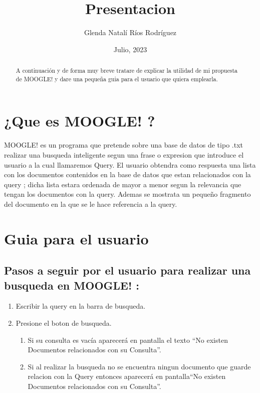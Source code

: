 \documentclass[a4paper,12pt]{article}
\begin{document}
\title{Presentacion}
\author{Glenda Natalí Ríos Rodríguez}
\date{Julio, 2023}
\maketitle

\begin{abstract}
   A continuación y de forma muy breve tratare de explicar la utilidad de mi propuesta de MOOGLE!
   y dare una pequeña guia para el usuario que quiera emplearla.  
\end{abstract}

\section{¿Que es MOOGLE! ?}\label{sec:intro}

MOOGLE! es un programa que pretende sobre una base de datos de tipo .txt realizar
una busqueda inteligente segun una frase o expresion que introduce el usuario a la cual
llamaremos Query.
El usuario obtendra como respuesta una lista con los documentos contenidos en la base de
datos que estan relacionados con la query ; dicha lista estara ordenada de mayor a menor
segun la relevancia que tengan los documentos con la query. Ademas se mostrata un pequeño
fragmento del documento en la que se le hace referencia a la query.


\section{Guia para el usuario}\label{sec:ent}


\subsection{Pasos a seguir por el usuario para realizar una busqueda en MOOGLE! :
}

\begin{enumerate}
    \item Escribir la query en la barra de busqueda. 
    \item Presione el boton de busqueda.
    \begin{enumerate}
        \item Si su consulta es vacía aparecerá en pantalla el texto
        “No existen Documentos relacionados con su Consulta”.
        \item Si al realizar la busqueda no se encuentra ningun documento que guarde 
        relacion con la Query entonces aparecerá en pantalla“No existen Documentos relacionados
        con su Consulta”.
    \end{enumerate}
\end{enumerate}
\end{document}
